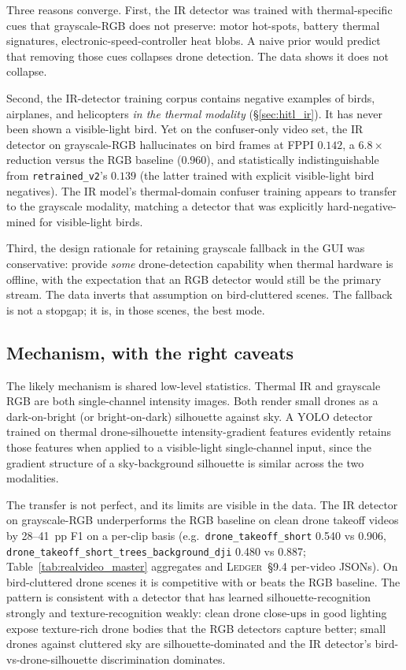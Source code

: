 \documentclass[12pt,a4paper,oneside,openright]{book}
\begin{document}
Three reasons converge. First, the IR detector was trained with thermal-specific cues that grayscale-RGB does not preserve: motor hot-spots, battery thermal signatures, electronic-speed-controller heat blobs. A naive prior would predict that removing those cues collapses drone detection. The data shows it does not collapse.

Second, the IR-detector training corpus contains negative examples of birds, airplanes, and helicopters \emph{in the thermal modality} (\S\ref{sec:hitl_ir}). It has never been shown a visible-light bird. Yet on the confuser-only video set, the IR detector on grayscale-RGB hallucinates on bird frames at FPPI $0.142$, a $6.8\times$ reduction versus the RGB baseline ($0.960$), and statistically indistinguishable from \texttt{retrained\_v2}'s $0.139$ (the latter trained with explicit visible-light bird negatives). The IR model's thermal-domain confuser training appears to transfer to the grayscale modality, matching a detector that was explicitly hard-negative-mined for visible-light birds.

Third, the design rationale for retaining grayscale fallback in the GUI was conservative: provide \emph{some} drone-detection capability when thermal hardware is offline, with the expectation that an RGB detector would still be the primary stream. The data inverts that assumption on bird-cluttered scenes. The fallback is not a stopgap; it is, in those scenes, the best mode.

\subsection{Mechanism, with the right caveats}

The likely mechanism is shared low-level statistics. Thermal IR and grayscale RGB are both single-channel intensity images. Both render small drones as a dark-on-bright (or bright-on-dark) silhouette against sky. A YOLO detector trained on thermal drone-silhouette intensity-gradient features evidently retains those features when applied to a visible-light single-channel input, since the gradient structure of a sky-background silhouette is similar across the two modalities.

The transfer is not perfect, and its limits are visible in the data. The IR detector on grayscale-RGB underperforms the RGB baseline on clean drone takeoff videos by 28--41~pp F1 on a per-clip basis (e.g.\ \texttt{drone\_takeoff\_short} 0.540 vs 0.906, \texttt{drone\_takeoff\_short\_trees\_background\_dji} 0.480 vs 0.887; Table~\ref{tab:realvideo_master} aggregates and \textsc{Ledger}~\S9.4 per-video JSONs). On bird-cluttered drone scenes it is competitive with or beats the RGB baseline. The pattern is consistent with a detector that has learned silhouette-recognition strongly and texture-recognition weakly: clean drone close-ups in good lighting expose texture-rich drone bodies that the RGB detectors capture better; small drones against cluttered sky are silhouette-dominated and the IR detector's bird-vs-drone-silhouette discrimination dominates.
\end{document}
